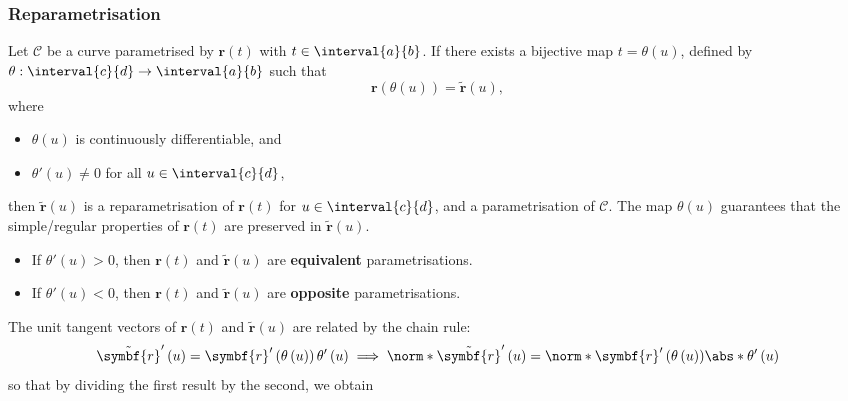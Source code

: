 \documentclass{article}
\begin{document}
\subsubsection{Reparametrisation}
Let \(\mathscr{C}\) be a curve parametrised by \(\symbf{r}\left( t
\right)\) with \(t \in \interval{a}{b}\). If there exists a bijective
map \(t = \theta\left( u \right)\), defined by \(\theta :
\interval{c}{d} \to \interval{a}{b}\) such that
\begin{equation*}
    \symbf{r}\left( \theta\left( u \right) \right) = \tilde{\symbf{r}}\left( u \right),
\end{equation*}
where
\begin{itemize}
    \item \(\theta\left( u \right)\) is continuously differentiable, and
    \item \(\theta'\left( u \right) \neq 0\) for all \(u \in \interval{c}{d}\),
\end{itemize}
then \(\tilde{\symbf{r}}\left( u \right)\) is a reparametrisation of
\(\symbf{r}\left( t \right)\) for \(u \in \interval{c}{d}\), and a
parametrisation of \(\mathscr{C}\). The map \(\theta\left( u \right)\)
guarantees that the simple/regular properties of \(\symbf{r}\left( t \right)\)
are preserved in \(\tilde{\symbf{r}}\left( u \right)\).
\begin{itemize}
    \item If \(\theta'\left( u \right) > 0\), then \(\symbf{r}\left( t
          \right)\) and \(\tilde{\symbf{r}}\left( u \right)\) are
          \textbf{equivalent} parametrisations.
    \item If \(\theta'\left( u \right) < 0\), then \(\symbf{r}\left( t
          \right)\) and \(\tilde{\symbf{r}}\left( u \right)\) are
          \textbf{opposite} parametrisations.
\end{itemize}
The unit tangent vectors of \(\symbf{r}\left( t \right)\) and
\(\tilde{\symbf{r}}\left( u \right)\) are related by the chain rule:
\begin{equation*}
    \tilde{\symbf{r}}'\left( u \right) = \symbf{r}'\left( \theta\left( u \right) \right) \theta'\left( u \right) \implies \norm*{\tilde{\symbf{r}}'\left( u \right)} = \norm*{\symbf{r}'\left( \theta\left( u \right) \right)} \abs*{\theta'\left( u \right)}
\end{equation*}
so that by dividing the first result by the second, we obtain
\end{document}
